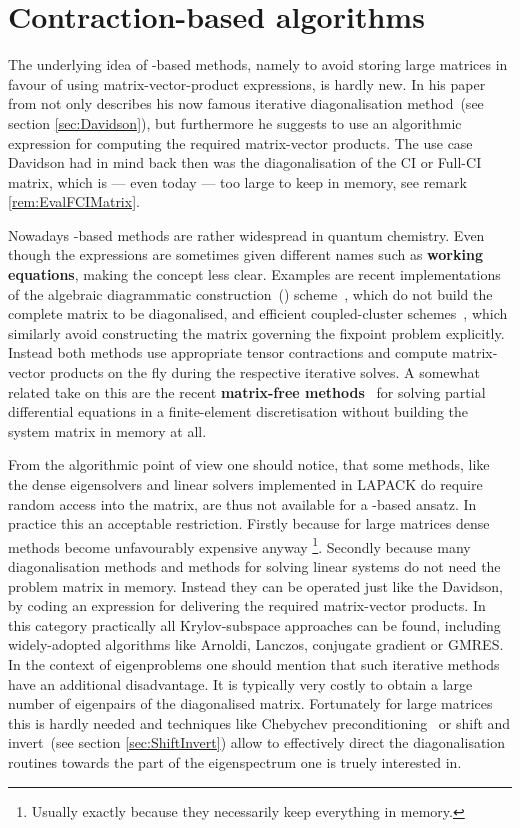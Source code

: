 \section{Contraction-based algorithms}
\label{sec:ContractionAlgos}

The underlying idea of \contraction-based methods,
namely to avoid storing large matrices in favour of using
matrix-vector-product expressions,
is hardly new.
In his paper from \citeyear{Davidson1975}
\citet{Davidson1975} not only describes his now famous
iterative diagonalisation method~(see section \ref{sec:Davidson}),
but furthermore he suggests to use an algorithmic expression
for computing the required matrix-vector products.
The use case Davidson had in mind back then was the
diagonalisation of the CI or Full-CI matrix,
which is --- even today --- too large to keep in memory,
see remark \vref{rem:EvalFCIMatrix}.

Nowadays \contraction-based methods
are rather widespread in quantum chemistry.
Even though the \contraction expressions are sometimes given different
names such as \textbf{working equations},
making the concept less clear.
Examples are recent implementations of the algebraic diagrammatic construction~(\ADC)
scheme~\cite{Wormit2009,Wormit2014,Dreuw2014},
which do not build the complete \ADC matrix to be diagonalised,
and efficient coupled-cluster schemes~\cite{Helgaker2013},
which similarly avoid constructing the matrix
governing the \CC fixpoint problem explicitly.
Instead both methods use appropriate tensor contractions
and compute matrix-vector products on the fly
during the respective iterative solves.
A somewhat related take on this are the recent
\textbf{matrix-free methods}~\cite{Kronbichler2012}
for solving partial differential equations in a finite-element discretisation
without building the system matrix in memory at all.

From the algorithmic point of view one should notice,
that some methods, like the dense eigensolvers and linear solvers
implemented in LAPACK
do require random access into the matrix,
are thus not available for a \contraction-based ansatz.
In practice this an acceptable restriction.
Firstly because for large matrices dense methods become
unfavourably expensive anyway%
\footnote{Usually exactly because they necessarily keep everything in memory.}.
Secondly because many diagonalisation methods and methods for solving linear systems
do not need the problem matrix in memory.
Instead they can be operated just like the Davidson,
by coding an expression for delivering the required matrix-vector products.
In this category practically all Krylov-subspace approaches can be found,
including widely-adopted algorithms like
\noindent
Arnoldi, Lanczos, conjugate gradient or GMRES.
In the context of eigenproblems
one should mention that such iterative methods
have an additional disadvantage.
It is typically very costly to obtain a large number of eigenpairs
of the diagonalised matrix.
Fortunately for large matrices this is hardly needed
and techniques like Chebychev preconditioning~
or shift and invert~(see section \vref{sec:ShiftInvert})
allow to effectively direct the diagonalisation routines
towards the part of the eigenspectrum one is truely interested in.

